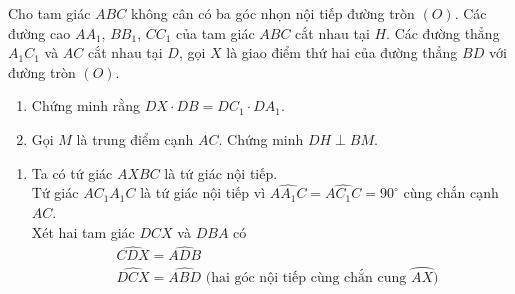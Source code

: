 \begin{ex}%
 Cho tam giác $ABC$ không cân có ba góc nhọn nội tiếp đường tròn $(O)$. Các đường cao $AA_1$, $BB_1$, $CC_1$ của tam giác $ABC$ cắt nhau tại $H$. Các đường thẳng $A_1 C_1$ và $AC$ cắt nhau tại $D$, gọi $X$ là giao điểm thứ hai của đường thẳng $BD$ với đường tròn $(O)$.
 \begin{enumerate}
  \item Chứng minh rằng $DX \cdot DB = DC_1 \cdot DA_1$.
  \item Gọi $M$ là trung điểm cạnh $AC$. Chứng minh $DH \perp BM$.
 \end{enumerate}
 \loigiai
  {
  \begin{center}
  \end{center}
  \begin{enumerate}
   \item Ta có tứ giác $AXBC$ là tứ giác nội tiếp.\\
   Tứ giác $AC_1A_1C$ là tứ giác nội tiếp vì $\widehat{AA_1C} = \widehat{AC_1C} = 90^\circ$ cùng chắn cạnh $AC$.\\
   Xét hai tam giác $DCX$ và $DBA$ có
   \begin{align*}
    & \widehat{CDX} = \widehat{ADB} \\
    & \widehat{DCX} = \widehat{ABD} \text{ (hai góc nội tiếp cùng chắn cung } \wideparen{AX})

\end{align*}
\end{enumerate}}
\end{ex}
